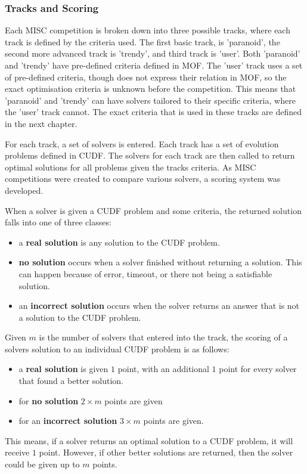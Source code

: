 \subsubsection{Tracks and Scoring}
Each MISC competition is broken down into three possible tracks, where each track is defined by the criteria used.
The first basic track, is 'paranoid', the second more advanced track is 'trendy', and third track is 'user'.
Both 'paranoid' and 'trendy' have pre-defined criteria defined in MOF.
The 'user' track uses a set of pre-defined criteria, though does not express their relation in MOF, so the exact optimisation criteria is unknown before the competition.
This means that 'paranoid' and 'trendy' can have solvers tailored to their specific criteria, where the 'user' track cannot.
The exact criteria that is used in these tracks are defined in the next chapter.

For each track, a set of solvers is entered.
Each track has a set of evolution problems defined in CUDF.
The solvers for each track are then called to return optimal solutions for all problems given the tracks criteria.
As MISC competitions were created to compare various solvers, a scoring system was developed. 

When a solver is given a CUDF problem and some criteria, the returned solution falls into one of three classes:
\begin{itemize}
  \item a \textbf{real solution} is any solution to the CUDF problem.
  \item \textbf{no solution} occurs when a solver finished without returning a solution. This can happen because of error, timeout, or there not being a satisfiable solution.
  \item an \textbf{incorrect solution} occurs when the solver returns an answer that is not a solution to the CUDF problem.
\end{itemize}

Given $m$ is the number of solvers that entered into the track, the scoring of a solvers solution to an individual CUDF problem is as follows:
\begin{itemize}
  \item a \textbf{real solution} is given $1$ point, with an additional $1$ point for every solver that found a better solution.
  \item for \textbf{no solution} $2\times m$ points are given
  \item for an \textbf{incorrect solution} $3 \times m$ points are given.
\end{itemize}
This means, if a solver returns an optimal solution to a CUDF problem, it will receive $1$ point.
However, if other better solutions are returned, then the solver could be given up to $m$ points.

